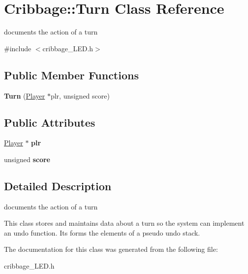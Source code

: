 \hypertarget{class_cribbage_1_1_turn}{}\section{Cribbage\+:\+:Turn Class Reference}
\label{class_cribbage_1_1_turn}


documents the action of a turn  




{\ttfamily \#include $<$cribbage\+\_\+\+L\+E\+D.\+h$>$}

\subsection*{Public Member Functions}
\begin{DoxyCompactItemize}
\item 
\mbox{\label{class_cribbage_1_1_turn_ab5f0642c19439b6b7165fa698159406b}} 
{\bfseries Turn} (\hyperlink{class_cribbage_1_1_player}{Player} $\ast$plr, unsigned score)
\end{DoxyCompactItemize}
\subsection*{Public Attributes}
\begin{DoxyCompactItemize}
\item 
\mbox{\label{class_cribbage_1_1_turn_aa7f6c98a737d25cb2e4fa62351323ce9}} 
\hyperlink{class_cribbage_1_1_player}{Player} $\ast$ {\bfseries plr}
\item 
\mbox{\label{class_cribbage_1_1_turn_a8c9daa66911d4e0827183daee29bbd58}} 
unsigned {\bfseries score}
\end{DoxyCompactItemize}


\subsection{Detailed Description}
documents the action of a turn 

This class stores and maintains data about a turn so the system can implement an undo function. It\textquotesingle{}s forms the elements of a pseudo undo stack. 

The documentation for this class was generated from the following file\+:\begin{DoxyCompactItemize}
\item 
cribbage\+\_\+\+L\+E\+D.\+h\end{DoxyCompactItemize}
